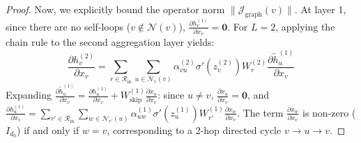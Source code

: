 \begin{proof}
Now, we explicitly bound the operator norm $\|\mathcal{J}_{\text{graph}}(v)\|$. At layer 1, since there are no self-loops ($v \notin \mathcal{N}(v)$), $\frac{\partial h_v^{(1)}}{\partial x_v} = \mathbf{0}$. For $L = 2$, applying the chain rule to the second aggregation layer yields:
\begin{equation}
\frac{\partial h_v^{(2)}}{\partial x_v} = \sum_{r \in \mathcal{R}_{\text{in}}} \sum_{u \in \mathcal{N}_r(v)} \alpha_{vu}^{(2)} \sigma'\left(z_v^{(2)}\right) W_r^{(2)} \frac{\partial \tilde{h}_u^{(1)}}{\partial x_v}
\end{equation}
Expanding $\frac{\partial \tilde{h}_u^{(1)}}{\partial x_v} = \frac{\partial h_u^{(1)}}{\partial x_v} + W_{\text{skip}}^{(1)} \frac{\partial x_u}{\partial x_v}$: since $u \neq v$, $\frac{\partial x_u}{\partial x_v} = \mathbf{0}$, and $\frac{\partial h_u^{(1)}}{\partial x_v} = \sum_{r' \in \mathcal{R}_{\text{in}}} \sum_{w \in \mathcal{N}_{r'}(u)} \alpha_{uw}^{(1)} \sigma'\left(z_u^{(1)}\right) W_{r'}^{(1)} \frac{\partial x_w}{\partial x_v}$. The term $\frac{\partial x_w}{\partial x_v}$ is non-zero ($I_{d_0}$) if and only if $w = v$, corresponding to a 2-hop directed cycle $v \to u \to v$.


\end{proof}
